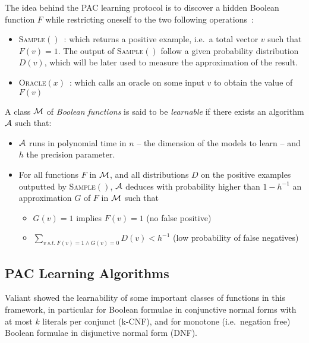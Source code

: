 \documentclass{llncs}
\begin{document}
The idea behind the PAC learning protocol is to discover a hidden Boolean function $F$ while restricting oneself to the two following operations~:
\begin{itemize}
  \item
\textsc{Sample}$()$~: which returns a positive example, i.e.~a total vector $v$ such that $F(v)=1$. 
The output of \textsc{Sample}$()$ follow a given probability distribution $D(v)$, which will be later used to measure the approximation of the result.
  \item
\textsc{Oracle}$(x)$~: which calls an oracle on some input $v$ to obtain the value of $F(v)$
\end{itemize}


\begin{definition}
	\label{def:learnclass}
   A class $\cal M$ of \emph{Boolean functions} is said to be \emph{learnable}
   if there exists an algorithm $\cal A$ such that:
   \begin{itemize}
      \item $\cal A$ runs in polynomial time in $n$ -- the dimension of the models to learn -- and $h$ the precision parameter.
      \item
         For all functions $F$ in $\cal M$, and all distributions $D$ on the positive examples outputted by \textsc{Sample}$()$,
         $\cal A$ deduces with probability higher than $1-h^{-1}$ an approximation $G$ of $F$ in $\cal M$ such that
         \begin{itemize}
            \item $G(v)=1$ implies $F(v)=1$ (no false positive)
            \item
               $\displaystyle\sum_{v\ s.t.\ F(v)=1\wedge G(v)=0} D(v) < h^{-1}$ (low probability of false negatives)
         \end{itemize}
   \end{itemize}
\end{definition}


\subsection{PAC Learning Algorithms}

Valiant showed the learnability of some important classes of functions in this framework,
in particular for Boolean formulae in conjunctive normal forms with at most $k$ literals per conjunct (k-CNF),
and for monotone (i.e.~negation free) Boolean formulae in disjunctive normal form (DNF).
\end{document}
